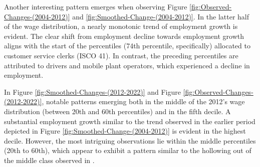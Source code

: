 \begin{onehalfspace}
Another interesting pattern emerges when observing Figure \ref{fig:Observed-Changes-(2004-2012)}
and \ref{fig:Smoothed-Change-(2004-2012)}. In the latter half of
the wage distribution, a nearly monotonic trend of employment growth
is evident. The clear shift from employment decline towards employment
growth aligns with the start of the percentiles (74th percentile,
specifically) allocated to customer service clerks (ISCO 41). In contrast,
the preceding percentiles are attributed to drivers and mobile plant
operators, which experienced a decline in employment.

In Figure \ref{fig:Smoothed-Changes-(2012-2022)} and Figure \ref{fig:Observed-Changes-(2012-2022)},
notable patterns emerging both in the middle of the 2012's wage distribution
(between 20th and 60th percentiles) and in the fifth decile. A substantial
employment growth similar to the trend observed in the earlier period
depicted in Figure \ref{fig:Smoothed-Change-(2004-2012)} is evident
in the highest decile. However, the most intriguing observations lie
within the middle percentiles (20th to 60th), which appear to exhibit
a pattern similar to the hollowing out of the middle class observed
in \citep{2013Autor}.
\end{onehalfspace}
